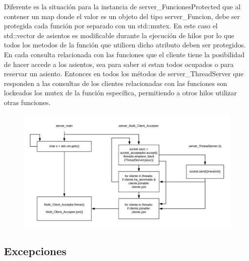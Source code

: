 \documentclass[a4paper,12pt]{report}
\begin{document}
Diferente es la situaci\'on para la instancia de server\_FuncionesProtected que al contener un map donde el valor es un objeto del tipo server\_Funcion, debe ser protegida cada funci\'on por separado con un std::mutex. En este caso el std::vector de asientos es modificable durante la ejecuci\'on de hilos por lo que todos los metodos de la funci\'on que utilicen dicho atributo deben ser protegidos. En cada consulta relacionada con las funciones que el cliente tiene la posibilidad de hacer accede a los asientos, sea para saber si estan todos ocupados o para reservar un asiento. Entonces en todos los m\'etodos de server\_ThreadServer que responden a las consultas de los clientes relacionadas con las funciones son lockeados los mutex de la funci\'on espec\'ifica, permitiendo a otros hilos utilizar otras funciones.\\


\begin{figure}
\centering
\includegraphics[scale=0.72]{servidor-multi-cliente.png}
\end{figure}


\subsection{Excepciones}
\end{document}
